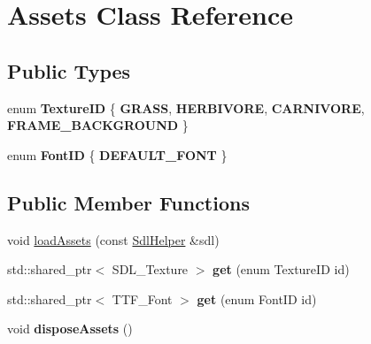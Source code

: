 \hypertarget{class_assets}{}\section{Assets Class Reference}
\label{class_assets}
\subsection*{Public Types}
\begin{DoxyCompactItemize}
\item 
\hypertarget{class_assets_a124ad6e4e23306a02182c9e9bff9077e}{}enum {\bfseries Texture\+I\+D} \{ {\bfseries G\+R\+A\+S\+S}, 
{\bfseries H\+E\+R\+B\+I\+V\+O\+R\+E}, 
{\bfseries C\+A\+R\+N\+I\+V\+O\+R\+E}, 
{\bfseries F\+R\+A\+M\+E\+\_\+\+B\+A\+C\+K\+G\+R\+O\+U\+N\+D}
 \}\label{class_assets_a124ad6e4e23306a02182c9e9bff9077e}

\item 
\hypertarget{class_assets_a1c314adc15f0955d73fd19bf78deff0d}{}enum {\bfseries Font\+I\+D} \{ {\bfseries D\+E\+F\+A\+U\+L\+T\+\_\+\+F\+O\+N\+T}
 \}\label{class_assets_a1c314adc15f0955d73fd19bf78deff0d}

\end{DoxyCompactItemize}
\subsection*{Public Member Functions}
\begin{DoxyCompactItemize}
\item 
void \hyperlink{class_assets_a28bccf60521a9718e85ddc8ece32cf7e}{load\+Assets} (const \hyperlink{class_sdl_helper}{Sdl\+Helper} \&sdl)
\item 
\hypertarget{class_assets_ade0991aab20ab534630c67fd9048da79}{}std\+::shared\+\_\+ptr$<$ S\+D\+L\+\_\+\+Texture $>$ {\bfseries get} (enum Texture\+I\+D id)\label{class_assets_ade0991aab20ab534630c67fd9048da79}

\item 
\hypertarget{class_assets_a6e17c5c3fffd6fdf471fa78b9cf61141}{}std\+::shared\+\_\+ptr$<$ T\+T\+F\+\_\+\+Font $>$ {\bfseries get} (enum Font\+I\+D id)\label{class_assets_a6e17c5c3fffd6fdf471fa78b9cf61141}

\item 
\hypertarget{class_assets_a6517210bf261d909e9f78880187feea1}{}void {\bfseries dispose\+Assets} ()\label{class_assets_a6517210bf261d909e9f78880187feea1}

\end{DoxyCompactItemize}
